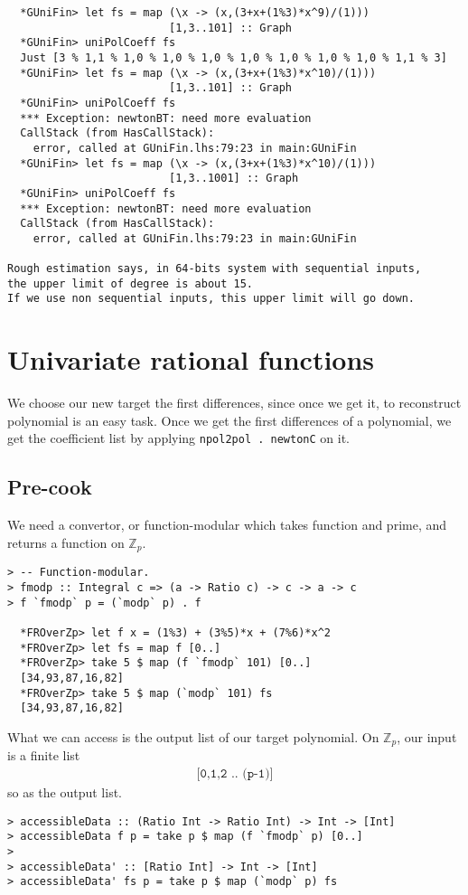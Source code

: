 \documentclass[11pt]{book}
\begin{document}
\begin{verbatim}
  *GUniFin> let fs = map (\x -> (x,(3+x+(1%3)*x^9)/(1))) 
                         [1,3..101] :: Graph
  *GUniFin> uniPolCoeff fs
  Just [3 % 1,1 % 1,0 % 1,0 % 1,0 % 1,0 % 1,0 % 1,0 % 1,0 % 1,1 % 3]
  *GUniFin> let fs = map (\x -> (x,(3+x+(1%3)*x^10)/(1))) 
                         [1,3..101] :: Graph
  *GUniFin> uniPolCoeff fs
  *** Exception: newtonBT: need more evaluation
  CallStack (from HasCallStack):
    error, called at GUniFin.lhs:79:23 in main:GUniFin
  *GUniFin> let fs = map (\x -> (x,(3+x+(1%3)*x^10)/(1))) 
                         [1,3..1001] :: Graph
  *GUniFin> uniPolCoeff fs
  *** Exception: newtonBT: need more evaluation
  CallStack (from HasCallStack):
    error, called at GUniFin.lhs:79:23 in main:GUniFin

Rough estimation says, in 64-bits system with sequential inputs,
the upper limit of degree is about 15.
If we use non sequential inputs, this upper limit will go down.
\end{verbatim}

\section{Univariate rational functions}


We choose our new target the first differences, since once we get it, to reconstruct polynomial is an easy task.
Once we get the first differences of a polynomial, we get the coefficient list by applying \texttt{npol2pol . newtonC} on it.

\subsection{Pre-cook}
We need a convertor, or function-modular which takes function and prime, and returns a function on $\mathbb{Z}_p$.
\begin{verbatim}
> -- Function-modular.
> fmodp :: Integral c => (a -> Ratio c) -> c -> a -> c
> f `fmodp` p = (`modp` p) . f

  *FROverZp> let f x = (1%3) + (3%5)*x + (7%6)*x^2
  *FROverZp> let fs = map f [0..]
  *FROverZp> take 5 $ map (f `fmodp` 101) [0..]
  [34,93,87,16,82]
  *FROverZp> take 5 $ map (`modp` 101) fs
  [34,93,87,16,82]
\end{verbatim}

What we can access is the output list of our target polynomial.
On $\mathbb{Z}_p$, our input is a finite list
\begin{eqnarray}
\texttt{[0,1,2 .. (p-1)]}
\end{eqnarray}
so as the output list.
\begin{verbatim}
> accessibleData :: (Ratio Int -> Ratio Int) -> Int -> [Int]
> accessibleData f p = take p $ map (f `fmodp` p) [0..]
> 
> accessibleData' :: [Ratio Int] -> Int -> [Int]
> accessibleData' fs p = take p $ map (`modp` p) fs
\end{verbatim}
\end{document}
